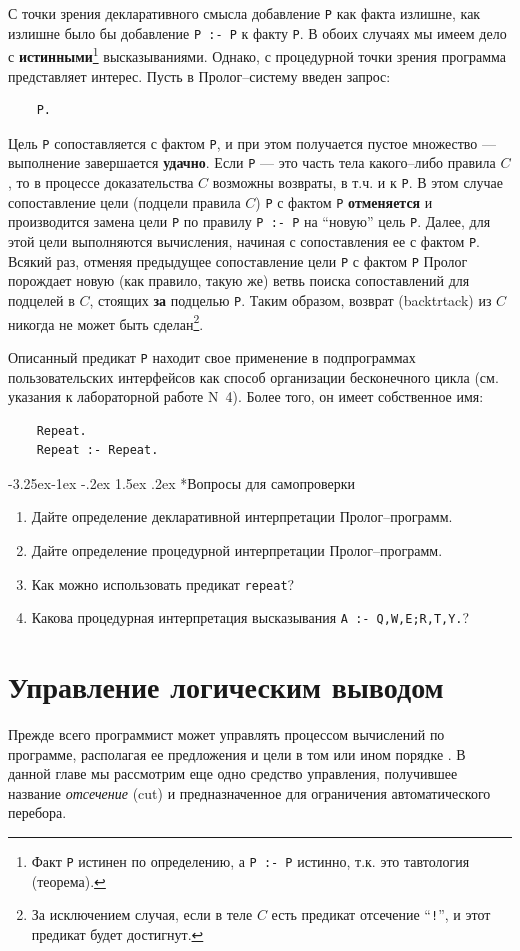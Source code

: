 \documentclass[12pt, openany, twoside]{book} %
\makeatletter
\renewcommand\subsubsection{\@startsection{subsubsection}{3}{\z@}%
                                     {-3.25ex\@plus -1ex \@minus -.2ex}%
                                     {1.5ex \@plus .2ex}%
                                     {\normalfont\normalsize\bfseries}}
\newenvironment{questions}{\subsubsection*{Вопросы для самопроверки}\begin{enumerate}}{\end{enumerate}}
\makeatother
\begin{document}
\noindent С точки зрения декларативного смысла добавление {\tt P} как факта излишне, как излишне было бы добавление {\tt P~:-~P} к факту {\tt P}. В обоих случаях мы имеем дело с {\bf истинными}\footnote{Факт {\tt P} истинен по определению, а {\tt P~:-~P} истинно, т.к. это тавтология (теорема).} высказываниями. Однако, с процедурной точки зрения программа представляет интерес. Пусть в Пролог--систему введен запрос:
{\tt\begin{verbatim}
    P.
\end{verbatim}}
\noindent Цель {\tt P} сопоставляется с фактом {\tt P}, и при этом получается пустое множество --- выполнение завершается {\bf удачно}. Если {\tt P} --- это часть тела какого--либо правила $C$, то в процессе доказательства $C$ возможны возвраты, в т.ч. и к {\tt P}. В этом случае сопоставление цели (подцели правила $C$) {\tt P} с фактом {\tt P} {\bf отменяется} и производится замена цели {\tt P} по правилу {\tt P~:-~P} на ``новую'' цель {\tt P}. Далее, для этой цели выполняются вычисления, начиная с сопоставления ее с фактом {\tt P}. Всякий раз, отменяя предыдущее сопоставление цели {\tt P} с фактом {\tt P} Пролог порождает новую (как правило, такую же) ветвь поиска сопоставлений для подцелей в $C$, стоящих {\bf за} подцелью {\tt P}. Таким образом, возврат (backtrtack) из $C$ никогда не может быть сделан\footnote{За исключением случая, если в теле $C$ есть предикат отсечение ``{\tt !}'', и этот предикат будет достигнут.}.

Описанный предикат {\tt P} находит свое применение в подпрограммах пользовательских интерфейсов как способ организации бесконечного цикла (см. указания к лабораторной работе N~4). Более того, он имеет собственное имя:
{\tt\begin{verbatim}
    Repeat.
    Repeat :- Repeat.
\end{verbatim}}

\begin{questions}
  \item{} Дайте определение декларативной интерпретации Пролог--программ.
  \item{} Дайте определение процедурной интерпретации Пролог--программ.
  \item{} Как можно использовать предикат \texttt{repeat}?
  \item{} Какова процедурная интерпретация высказывания \texttt{A :- Q,W,E;R,T,Y.}?
\end{questions}


\chapter{Управление логическим выводом}
Прежде всего программист может управлять процессом вычислений по программе, располагая ее предложения и цели в том или ином порядке \cite{Bratko}. В данной главе мы рассмотрим еще одно средство управления, получившее название {\em отсечение} (cut) и предназначенное для ограничения автоматического перебора.
\end{document}

